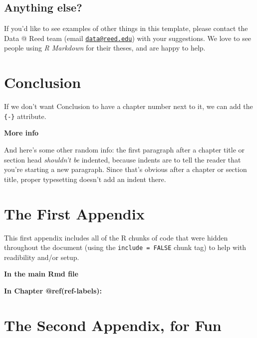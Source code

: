 \documentclass[
  letterpaper,
  12pt,
  twoside]{book}
\begin{document}
\section{Anything else?}\label{anything-else}

If you'd like to see examples of other things in this template, please
contact the Data @ Reed team (email
\href{mailto:data@reed.edu}{\nolinkurl{data@reed.edu}}) with your
suggestions. We love to see people using \emph{R Markdown} for their
theses, and are happy to help.


\chapter*{Conclusion}\label{conclusion}


If we don't want Conclusion to have a chapter number next to it, we can
add the \texttt{\{-\}} attribute.

\textbf{More info}

And here's some other random info: the first paragraph after a chapter
title or section head \emph{shouldn't be} indented, because indents are
to tell the reader that you're starting a new paragraph. Since that's
obvious after a chapter or section title, proper typesetting doesn't add
an indent there.


\chapter{The First Appendix}\label{the-first-appendix}

\appendix

This first appendix includes all of the R chunks of code that were
hidden throughout the document (using the \texttt{include\ =\ FALSE}
chunk tag) to help with readibility and/or setup.

\textbf{In the main Rmd file}

\textbf{In Chapter @ref(ref-labels):}


\chapter{The Second Appendix, for
Fun}\label{the-second-appendix-for-fun}
\end{document}
